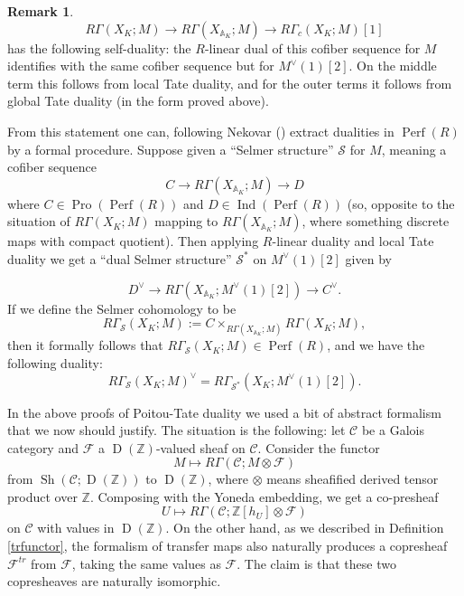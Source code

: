 \documentclass[12pt]{article}
\theoremstyle{definition}
\newtheorem{remark}[theorem]{Remark}
\newcommand{\on}{\operatorname}
\newcommand{\mc}{\mathcal}
\newcommand{\mbb}{\mathbb}
\begin{document}
\begin{remark}
$$R\Gamma(X_K;M) \to R\Gamma(X_{\mbb{A}_K};M) \to R\Gamma_c(X_K;M)[1]$$
has the following self-duality: the $R$-linear dual of this cofiber sequence  for $M$ identifies with the same cofiber sequence but for $M^\vee(1)[2]$.  On the middle term this follows from local Tate duality, and for the outer terms it follows from global Tate duality (in the form proved above).

From this statement one can, following Nekovar (\cite{nekovar}) extract dualities in $\on{Perf}(R)$ by a formal procedure.  Suppose given a ``Selmer structure'' $\mc{S}$ for $M$, meaning a cofiber sequence
$$ C \to R\Gamma(X_{\mbb{A}_K};M) \to D$$
where $C\in\on{Pro}(\on{Perf}(R))$ and $D\in\on{Ind}(\on{Perf}(R))$ (so, opposite to the situation of $R\Gamma(X_K;M)$ mapping to $R\Gamma(X_{\mbb{A}_K};M)$, where something discrete maps with compact quotient).  Then applying $R$-linear duality and local Tate duality we get a ``dual Selmer structure'' $\mc{S}^\ast$ on $M^\vee (1)[2]$ given by

$$ D^\vee \to R\Gamma(X_{\mbb{A}_K};M^\vee (1)[2]) \to C^\vee.$$
If we define the Selmer cohomology to be
$$R\Gamma_{\mc{S}}(X_K;M) := C\times_{R\Gamma(X_{\mbb{A}_K};M)}R\Gamma(X_K;M),$$
then it formally follows that $R\Gamma_{\mc{S}}(X_K;M)\in \on{Perf}(R)$, and we have the following duality:
$$R\Gamma_{\mc{S}}(X_K;M)^\vee = R\Gamma_{\mc{S}^\ast}(X_K;M^\vee(1)[2]).$$
\end{remark}



In the above proofs of Poitou-Tate duality we used a bit of abstract formalism that we now should justify.  The situation is the following: let $\mc{C}$ be a Galois category and $\mc{F}$ a $\on{D}(\mbb{Z})$-valued sheaf on $\mc{C}$.  Consider the functor
$$M\mapsto R\Gamma(\mc{C};M\otimes\mc{F})$$
from $\on{Sh}(\mc{C};\on{D}(\mbb{Z}))$ to $\on{D}(\mbb{Z})$, where $\otimes$  means sheafified derived tensor product over $\mbb{Z}$.  Composing with the Yoneda embedding, we get a co-presheaf
$$U \mapsto R\Gamma(\mc{C};\mbb{Z}[h_U]\otimes\mc{F})$$
on $\mc{C}$ with values in $\on{D}(\mbb{Z})$.  On the other hand, as we described in Definition \ref{trfunctor}, the formalism of transfer maps also naturally produces a copresheaf $\mc{F}^{tr}$ from $\mc{F}$, taking the same values as $\mc{F}$.  The claim is that these two copresheaves are naturally isomorphic.
\end{document}
